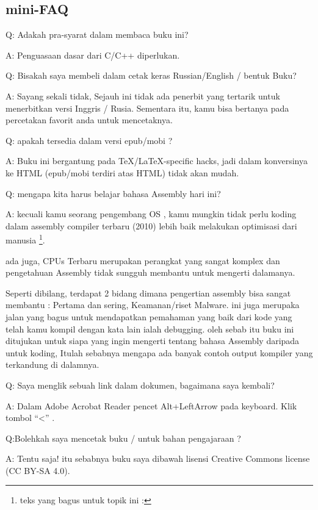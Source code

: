 \subsection*{mini-FAQ}

\par Q: Adakah pra-syarat dalam membaca buku ini?
\par A: Penguasaan dasar dari  C/C++ diperlukan.

\par Q: Bisakah saya membeli dalam cetak keras Russian/English / bentuk Buku?
\par A: Sayang sekali tidak, Sejauh ini tidak ada penerbit yang tertarik untuk menerbitkan versi Inggris / Rusia.
Sementara itu, kamu bisa bertanya pada percetakan favorit anda untuk mencetaknya.

\par Q: apakah tersedia dalam versi epub/mobi ?
\par A: Buku ini bergantung pada TeX/LaTeX-specific hacks, jadi dalam konversinya ke HTML (epub/mobi terdiri atas HTML)
tidak akan mudah.

\par Q: mengapa kita harus belajar bahasa Assembly hari ini?
\par A: kecuali kamu seorang pengembang \ac{OS} , kamu mungkin tidak perlu koding dalam assembly\textemdash{} compiler terbaru (2010) lebih baik melakukan optimisasi dari manusia \footnote{teks yang bagus untuk topik ini : \InSqBrackets{\AgnerFog}}.

ada juga, \ac{CPU}s Terbaru merupakan perangkat yang sangat komplex dan pengetahuan Assembly tidak sungguh membantu untuk mengerti dalamanya.

Seperti dibilang, terdapat 2 bidang dimana pengertian assembly bisa sangat membantu : 
Pertama dan sering, Keamanan/riset Malware. ini juga merupaka jalan yang bagus untuk mendapatkan pemahaman yang baik dari kode yang telah kamu kompil dengan kata lain ialah debugging.
oleh sebab itu buku ini ditujukan untuk siapa yang ingin mengerti tentang bahasa Assembly daripada 
untuk koding, Itulah sebabnya mengapa ada banyak contoh output kompiler yang terkandung di dalamnya.

\par Q: Saya menglik sebuah link dalam dokumen, bagaimana saya kembali?
\par A: Dalam Adobe Acrobat Reader pencet Alt+LeftArrow pada keyboard. Klik tombol ``<'' .

\par Q:Bolehkah saya mencetak buku / untuk bahan pengajaraan ?
\par A: Tentu saja! itu sebabnya buku saya dibawah lisensi Creative Commons license (CC BY-SA 4.0).

